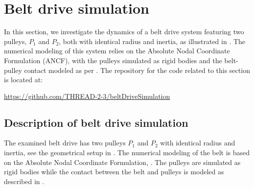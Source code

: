 \section{Belt drive simulation}\label{sec:beltdrive}
In this section, we investigate the dynamics of a belt drive system featuring two pulleys, $P_1$ and $P_2$, both with identical radius and inertia, as illustrated in . The numerical modeling of this system relies on the Absolute Nodal Coordinate Formulation (ANCF), with the pulleys simulated as rigid bodies and the belt-pulley contact modeled as per \cite{Ntarladima2023}.
The repository for the code related to this section is located at:
\bi
  \item[] \url{https://github.com/THREAD-2-3/beltDriveSimulation}
\ei

\subsection{Description of belt drive simulation}
The examined belt drive has two pulleys $P_1$ and $P_2$ with identical radius and inertia, see the geometrical setup in .
%
The numerical modeling of the belt is based on the Absolute Nodal Coordinate Formulation, \cite{Gerstmayr2008}. The pulleys are simulated as rigid bodies while the contact between the belt and pulleys is modeled as described in \cite{Ntarladima2023}.


